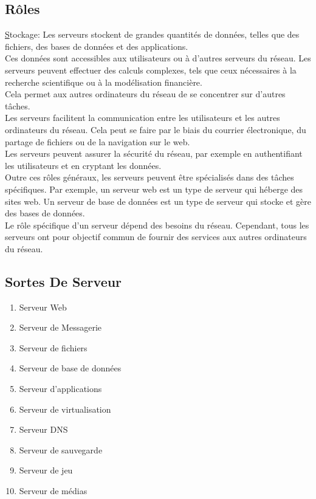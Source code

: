  \subsection*{Rôles}
  \underline Stockage: Les serveurs stockent de grandes quantités de données, telles que des fichiers, des bases de données et des applications.\\
   Ces données sont accessibles aux utilisateurs ou à d'autres serveurs du réseau.
  Les serveurs peuvent effectuer des calculs complexes, tels que ceux nécessaires à la recherche scientifique ou à la modélisation financière.\\ Cela permet aux autres ordinateurs du réseau de se concentrer sur d'autres tâches.\\
   Les serveurs facilitent la communication entre les utilisateurs et les autres ordinateurs du réseau. Cela peut se faire par le biais du courrier électronique, du partage de fichiers ou de la navigation sur le web.\\
   Les serveurs peuvent assurer la sécurité du réseau, par exemple en authentifiant les utilisateurs et en cryptant les données.\\
 Outre ces rôles généraux, les serveurs peuvent être spécialisés dans des tâches spécifiques. Par exemple, un serveur web est un type de serveur qui héberge des sites web. Un serveur de base de données est un type de serveur qui stocke et gère des bases de données.\\
 Le rôle spécifique d'un serveur dépend des besoins du réseau. Cependant, tous les serveurs ont pour objectif commun de fournir des services aux autres ordinateurs du réseau.
 
 \subsection*{ Sortes De Serveur}
\begin{enumerate}
     \item Serveur Web
     \item Serveur de Messagerie
     \item Serveur de fichiers
     \item Serveur de base de données 
     \item Serveur d'applications
     \item Serveur de virtualisation
     \item Serveur DNS
     \item Serveur de sauvegarde 
     \item Serveur de jeu 
     \item Serveur de médias    
\end{enumerate}
